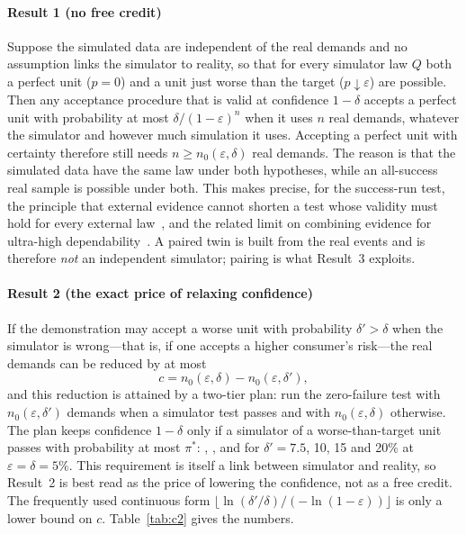 \paragraph{Result 1 (no free credit)}\label{res:c1} Suppose the simulated data are independent of the real demands and no
assumption links the simulator to reality, so that for every simulator law $Q$ both a perfect unit ($p=0$) and a unit just
worse than the target ($p\downarrow\varepsilon$) are possible. Then any acceptance procedure that is valid at confidence
$1-\delta$ accepts a perfect unit with probability at most $\delta/(1-\varepsilon)^n$ when it uses $n$ real demands,
whatever the simulator and however much simulation it uses. Accepting a perfect unit with certainty therefore still
needs $n\ge n_0(\varepsilon,\delta)$ real demands. The reason is that the simulated data have the same law under both
hypotheses, while an all-success real sample is possible under both. This makes precise, for the success-run test, the principle that external evidence cannot shorten a test whose validity must hold for every external law~\cite{koppschneider2020}, and the related limit on combining evidence for ultra-high dependability~\cite{littlewood1993}. A paired twin is built from the real events and is therefore \emph{not} an
independent simulator; pairing is what Result~3 exploits.

\paragraph{Result 2 (the exact price of relaxing confidence)}\label{res:c2} If the demonstration may accept a worse unit
with probability $\delta'>\delta$ when the simulator is wrong---that is, if one accepts a higher consumer's risk---the
real demands can be reduced by at most
\[c=n_0(\varepsilon,\delta)-n_0(\varepsilon,\delta'),\]
and this reduction is attained by a two-tier plan: run the zero-failure test with $n_0(\varepsilon,\delta')$ demands when
a simulator test passes and with $n_0(\varepsilon,\delta)$ otherwise. The plan keeps confidence $1-\delta$ only if a simulator of a worse-than-target unit passes with probability at most
$\pi^\ast$: \nPiStarA, \nPiStarB, \nPiStarC{} and \nPiStarD{} for $\delta'=7.5$, 10, 15 and 20\% at $\varepsilon=\delta=5\%$.
This requirement is itself a link between simulator and reality, so Result~2 is best read as the price of lowering
the confidence, not as a free credit. The frequently
used continuous form $\lfloor\ln(\delta'/\delta)/(-\ln(1-\varepsilon))\rfloor$ is only a lower bound on $c$.
Table~\ref{tab:c2} gives the numbers.

